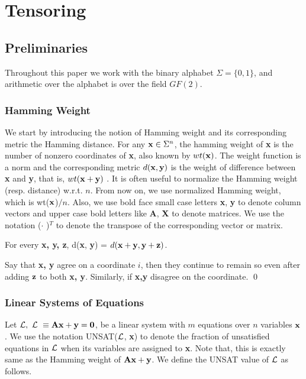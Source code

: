 \chapter{Tensoring}
\section{Preliminaries}

Throughout this paper we work with the binary alphabet $\Sigma =
\{0,1\}$, and arithmetic over the alphabet is over the field $GF(2)$.

\subsection{Hamming Weight}

We start by introducing the notion of Hamming weight and its
corresponding metric the Hamming distance. For any ${\bf x} \in
\Sigma^n$, the hamming weight of {\bf x} is the number of nonzero
coordinates of {\bf x}, also known by $wt({\bf x})$. The weight
function is a norm and the corresponding metric $d({\bf x, y})$ is the
weight of difference between {\bf x} and {\bf y}, that is, $wt({\bf x}
+ {\bf y})$ . It is often useful to normalize the Hamming weight
(resp. distance) w.r.t. $n$. From now on, we use normalized Hamming
weight, which is wt(${\bf x}$)$/n$. Also, we use bold face small case
letters {\bf x}, {\bf y} to denote column vectors and upper case bold
letters like {\bf A}, {\bf X} to denote matrices.  We use the notation
({\bf $\cdot$ })$^T$ to denote the transpose of the corresponding
vector or matrix.

\begin{claim} \label{ind} For every {\bf x, y, z}, d({\bf x}, {\bf y})
  = $d({\bf x} + {\bf y}, {\bf y} + {\bf z})$.
\end{claim}
 Say that {\bf x, y} agree on a coordinate $i$,
then they continue to remain so even after adding ${\bf z}$ to both
{\bf x, y}. Similarly, if {\bf x,y} disagree on the coordinate. \qed

\subsection{Linear Systems of Equations}

Let ${\cal L},\ {\cal L} \ \equiv {\bf Ax} + {\bf y} = {\bf 0}$, be a linear
system with $m$ equations over $n$ variables ${\bf x}$. We use the notation
UNSAT(${\cal L}$, {\bf x}) to denote the fraction of unsatisfied equations
in ${\cal L}$ when its variables are assigned to {\bf x}. Note that, this
is exactly same as the Hamming weight of ${\bf Ax} + {\bf y}$. We
define the UNSAT value of ${\cal L}$ as follows.


